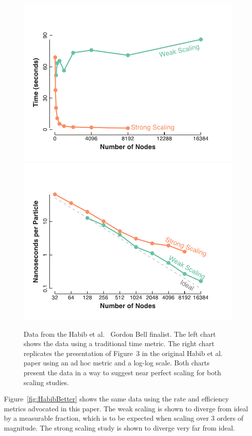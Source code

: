\documentclass{llncs}
\newcommand*{\scite}[1]{~\cite{#1}}
\newcommand{\etal}{et al.\xspace}
\begin{document}
\begin{figure}[htb]
  \centering
  \includegraphics[width=.48\linewidth]{images/HabibTime}\quad
  \includegraphics[width=.48\linewidth]{images/HabibTimePerParticle}
  \caption{Data from the Habib \etal\scite{Habib2013} Gordon Bell
    finalist. The left chart shows the data using a traditional time
    metric. The right chart replicates the presentation of Figure~3 in the
    original Habib \etal paper using an ad hoc metric and a log-log
    scale. Both charts present the data in a way to suggest near perfect
    scaling for both scaling studies.}
  \label{fig:HabibTraditional}
\end{figure}

Figure~\ref{fig:HabibBetter} shows the same data using the rate and
efficiency metrics advocated in this paper. The weak scaling is shown to
diverge from ideal by a measurable fraction, which is to be expected when
scaling over 3 orders of magnitude. The strong scaling study is shown to
diverge very far from ideal.
\end{document}
